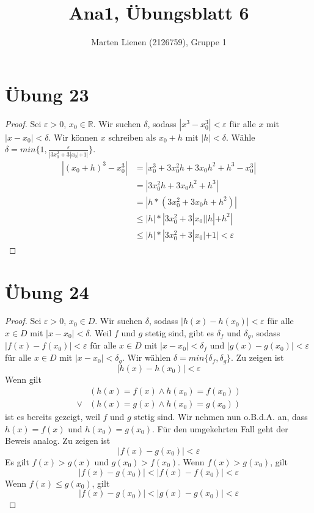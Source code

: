 \documentclass[a4paper,10pt]{article}
\title{Ana1, Übungsblatt 6}
\author{Marten Lienen (2126759), Gruppe 1}
\begin{document}
\maketitle

\section*{Übung 23}

\begin{proof}
 Sei $\varepsilon > 0$, $x_0 \in \mathbb{R}$.
 Wir suchen $\delta$, sodass $|x^3 - x_0^3| < \varepsilon$ für alle $x$ mit $|x - x_0| < \delta$.
 Wir können $x$ schreiben als $x_0 + h$ mit $|h| < \delta$.
 Wähle $\delta = min \{1, \frac{\varepsilon}{|3x_0^2 + 3|x_0| + 1|} \}$.
 \begin{align*}
  |(x_0 + h)^3 - x_0^3| & = |x_0^3 + 3x_0^2h + 3x_0h^2 + h^3 - x_0^3|\\
  & = |3x_0^2h + 3x_0h^2 + h^3|\\
  & = |h * (3x_0^2 + 3x_0h + h^2)|\\
  & \le |h| * |3x_0^2 + 3|x_0||h| + h^2|\\
  & \le |h| * |3x_0^2 + 3|x_0| + 1|< \varepsilon
 \end{align*}
\end{proof}

\section*{Übung 24}

\begin{proof}
 Sei $\varepsilon > 0$, $x_0 \in D$.
 Wir suchen $\delta$, sodass $|h(x) - h(x_0)| < \varepsilon$ für alle $x \in D$ mit $|x - x_0| < \delta$.
 Weil $f$ und $g$ stetig sind, gibt es $\delta_f$ und $\delta_g$, sodass $|f(x) - f(x_0)| < \varepsilon$ für alle $x \in D$ mit $|x - x_0| < \delta_f$ und $|g(x) - g(x_0)| < \varepsilon$ für alle $x \in D$ mit $|x - x_0| < \delta_g$.
 Wir wählen $\delta = min \{\delta_f, \delta_g\}$.
 Zu zeigen ist
 \begin{equation}
  |h(x) - h(x_0)| < \varepsilon
 \end{equation}
 Wenn gilt
 \begin{align*}
  & (h(x) = f(x) \land h(x_0) = f(x_0))\\
  \lor & (h(x) = g(x) \land h(x_0) = g(x_0))
 \end{align*}
 ist es bereits gezeigt, weil $f$ und $g$ stetig sind.
 Wir nehmen nun o.B.d.A. an, dass $h(x) = f(x)$ und $h(x_0) = g(x_0)$.
 Für den umgekehrten Fall geht der Beweis analog.
 Zu zeigen ist
 \begin{equation}
  |f(x) - g(x_0)| < \varepsilon
 \end{equation}
 Es gilt $f(x) > g(x)$ und $g(x_0) > f(x_0)$.
 Wenn $f(x) > g(x_0)$, gilt
 \begin{equation}
  |f(x) - g(x_0)| < |f(x) - f(x_0)| < \varepsilon
 \end{equation}
 Wenn $f(x) \le g(x_0)$, gilt
 \begin{equation}
  |f(x) - g(x_0)| < |g(x) - g(x_0)| < \varepsilon
 \end{equation}
\end{proof}
\end{document}
